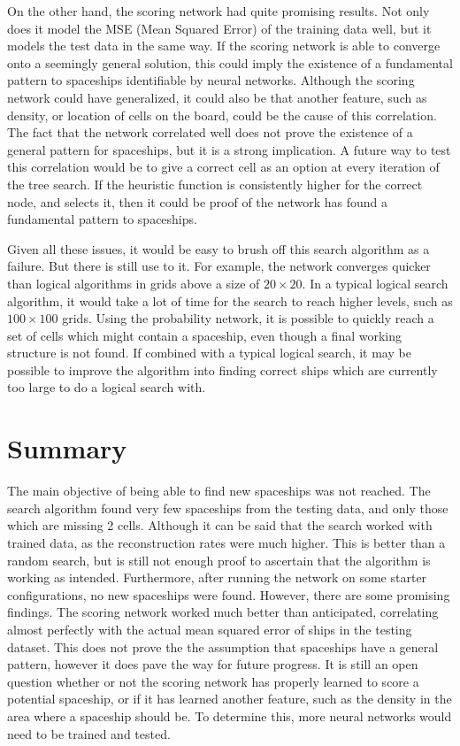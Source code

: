 \documentclass{l4proj}
\begin{document}
On the other hand, the scoring network had quite promising results. Not only does it model the MSE (Mean Squared Error) of the training data well, but it models the test data in the same way. If the scoring network is able to converge onto a seemingly general solution, this could imply the existence of a fundamental pattern to spaceships identifiable by neural networks. Although the scoring network could have generalized, it could also be that another feature, such as density, or location of cells on the board, could be the cause of this correlation. The fact that the network correlated well does not prove the existence of a general pattern for spaceships, but it is a strong implication. A future way to test this correlation would be to give a correct cell as an option at every iteration of the tree search. If the heuristic function is consistently higher for the correct node, and selects it, then it could be proof of the network has found a fundamental pattern to spaceships. 

Given all these issues, it would be easy to brush off this search algorithm as a failure. But there is still use to it. For example, the network converges quicker than logical algorithms in grids above a size of $20 \times 20$. In a typical logical search algorithm, it would take a lot of time for the search to reach higher levels, such as $100 \times 100$ grids. Using the probability network, it is possible to quickly reach a set of cells which might contain a spaceship, even though a final working structure is not found. If combined with a typical logical search, it may be possible to improve the algorithm into finding correct ships which are currently too large to do a logical search with.

\section{Summary}

The main objective of being able to find new spaceships was not reached. The search algorithm found very few spaceships from the testing data, and only those which are missing 2 cells. Although it can be said that the search worked with trained data, as the reconstruction rates were much higher. This is better than a random search, but is still not enough proof to ascertain that the algorithm is working as intended. Furthermore, after running the network on some starter configurations, no new spaceships were found. However, there are some promising findings. The scoring network worked much better than anticipated, correlating almost perfectly with the actual mean squared error of ships in the testing dataset. This does not prove the the assumption that spaceships have a general pattern, however it does pave the way for future progress. It is still an open question whether or not the scoring network has properly learned to score a potential spaceship, or if it has learned another feature, such as the density in the area where a spaceship should be. To determine this, more neural networks would need to be trained and tested.
\end{document}
